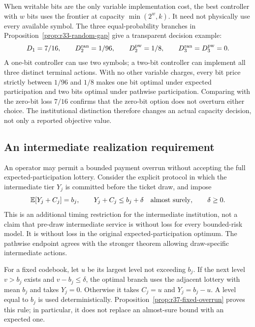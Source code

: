 When writable bits are the only variable implementation cost, the best controller with $w$ bits uses the frontier at capacity $\min(2^w,k)$. It need not physically use every available symbol. The three equal-probability branches in Proposition~\ref{prop:r33-random-gap} give a transparent decision example:
\[
 D_1=7/16,\qquad D_2^{\rm ran}=1/96,\qquad
 D_2^{\rm pw}=1/8,\qquad D_3^{\rm ran}=D_3^{\rm pw}=0.
\]
A one-bit controller can use two symbols; a two-bit controller can implement all three distinct terminal actions. With no other variable charges, every bit price strictly between $1/96$ and $1/8$ makes one bit optimal under expected participation and two bits optimal under pathwise participation. Comparing with the zero-bit loss $7/16$ confirms that the zero-bit option does not overturn either choice. The institutional distinction therefore changes an actual capacity decision, not only a reported objective value.

\subsection{An intermediate realization requirement}
An operator may permit a bounded payment overrun without accepting the full expected-participation lottery. Consider the explicit protocol in which the intermediate tier $Y_j$ is committed before the ticket draw, and impose
\begin{equation}\label{eq:r37-overrun}
 \mathbb E[Y_j+C_j]=b_j,\qquad Y_j+C_j\leq b_j+\delta
 \quad\hbox{almost surely},\qquad \delta\geq0.
\end{equation}
This is an additional timing restriction for the intermediate institution, not a claim that pre-draw intermediate service is without loss for every bounded-risk model. It is without loss in the original expected-participation optimum. The pathwise endpoint agrees with the stronger theorem allowing draw-specific intermediate actions.

For a fixed codebook, let $u$ be its largest level not exceeding $b_j$. If the next level $v>b_j$ exists and $v-b_j\leq\delta$, the optimal branch uses the adjacent lottery with mean $b_j$ and takes $Y_j=0$. Otherwise it takes $C_j=u$ and $Y_j=b_j-u$. A level equal to $b_j$ is used deterministically. Proposition~\ref{prop:r37-fixed-overrun} proves this rule; in particular, it does not replace an almost-sure bound with an expected one.

